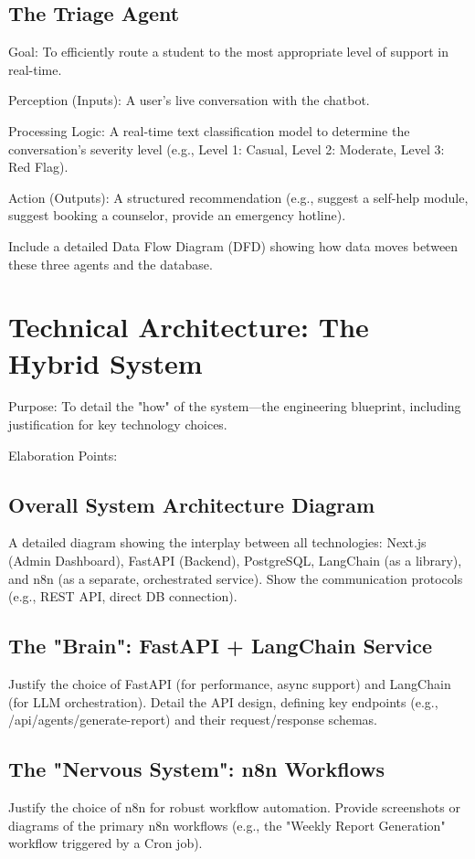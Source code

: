 \subsection{The Triage Agent}

Goal: To efficiently route a student to the most appropriate level of support in real-time.

Perception (Inputs): A user's live conversation with the chatbot.

Processing Logic: A real-time text classification model to determine the conversation's severity level (e.g., Level 1: Casual, Level 2: Moderate, Level 3: Red Flag).

Action (Outputs): A structured recommendation (e.g., suggest a self-help module, suggest booking a counselor, provide an emergency hotline).

Include a detailed Data Flow Diagram (DFD) showing how data moves between these three agents and the database.

\section{Technical Architecture: The Hybrid System}
Purpose: To detail the "how" of the system—the engineering blueprint, including justification for key technology choices.

Elaboration Points:

\subsection{Overall System Architecture Diagram}
A detailed diagram showing the interplay between all technologies: Next.js (Admin Dashboard), FastAPI (Backend), PostgreSQL, LangChain (as a library), and n8n (as a separate, orchestrated service). Show the communication protocols (e.g., REST API, direct DB connection).

\subsection{The "Brain": FastAPI + LangChain Service}
Justify the choice of FastAPI (for performance, async support) and LangChain (for LLM orchestration). Detail the API design, defining key endpoints (e.g., /api/agents/generate-report) and their request/response schemas.

\subsection{The "Nervous System": n8n Workflows} 
Justify the choice of n8n for robust workflow automation. Provide screenshots or diagrams of the primary n8n workflows (e.g., the "Weekly Report Generation" workflow triggered by a Cron job).

